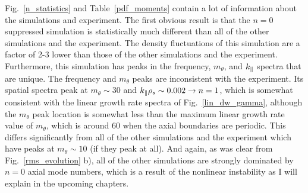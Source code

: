 Fig.~\ref{n_statistics} and Table~\ref{pdf_moments} contain a lot of information about the simulations and experiment. 
The first obvious result is that the $n=0$ suppressed simulation is statistically much different
than all of the other simulations and the experiment. The density fluctuations of this simulation are a factor of 2-3 lower than those of the other simulations and the experiment.
Furthermore, this simulation has peaks in the frequency, $m_\theta$, and $k_\parallel$ spectra that are unique. The frequency and $m_\theta$ peaks are inconsistent with the experiment. 
Its spatial spectra peak at
$m_\theta \sim 30$ and $k_\parallel \rho_s \sim 0.002 \rightarrow n = 1$, which is somewhat consistent with the linear growth rate spectra of Fig.~\ref{lin_dw_gamma}, although the $m_\theta$
peak location is somewhat less than the maximum linear growth rate value of $m_\theta$, which is around 60 when the axial boundaries are periodic. 
This differs significantly from all of the other simulations and the experiment which have peaks at $m_\theta \sim 10$ (if they peak at all).
And again, as was clear from Fig.~\ref{rms_evolution} b), all of the other simulations are strongly dominated by $n=0$ axial mode numbers, which is a result of the nonlinear instability as I will explain
in the upcoming chapters.

